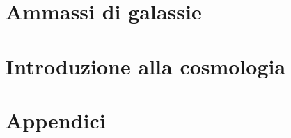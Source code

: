 \documentclass[a4paper, 11pt]{book} %
\begin{document}
\chapter{Ammassi di galassie}

\chapter{Introduzione alla cosmologia}

%

\appendix
\chapter{Appendici}



\end{document}
